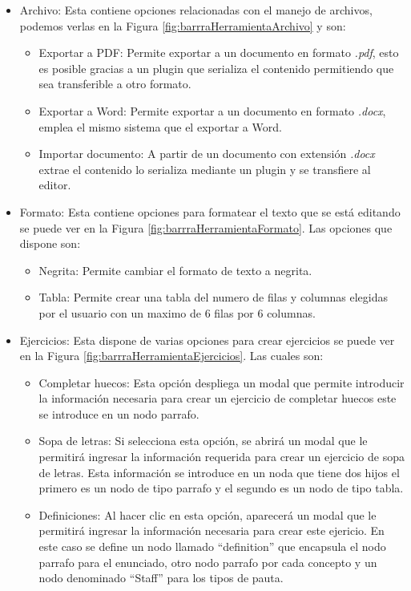 \begin{itemize}
  \item Archivo: Esta contiene opciones relacionadas con el manejo de archivos, podemos verlas en la Figura \ref{fig:barrraHerramientaArchivo} y son:
        \begin{itemize}
          \item  Exportar a PDF: Permite exportar a un documento en formato \textit{.pdf}, esto es posible gracias a un plugin que serializa el contenido permitiendo que sea transferible a otro formato.
          \item  Exportar a Word: Permite exportar a un documento en formato \textit{.docx}, emplea el mismo sistema que el exportar a Word.
          \item Importar documento: A partir de un documento con extensión \textit{.docx} extrae el contenido lo serializa mediante un plugin y se transfiere al editor.
        \end{itemize}
  \item Formato: Esta contiene opciones para formatear el texto que se está editando se puede ver en la Figura \ref{fig:barrraHerramientaFormato}. Las opciones que dispone son:
        \begin{itemize}
          \item Negrita: Permite cambiar el formato de texto a negrita.
          \item Tabla: Permite crear una tabla del numero de filas y columnas elegidas por el usuario con un maximo de 6 filas por 6 columnas.
        \end{itemize}
  \item Ejercicios: Esta dispone de varias opciones para crear ejercicios se puede ver en la Figura \ref{fig:barrraHerramientaEjercicios}. Las cuales son:
        \begin{itemize}
          \item Completar huecos: Esta opción despliega un modal que permite introducir la información necesaria para crear un ejercicio de completar huecos este se introduce en un nodo parrafo.
          \item Sopa de letras: Si selecciona esta opción, se abrirá un modal que le permitirá ingresar la información requerida para crear un ejercicio de sopa de letras. Esta información se introduce en un noda que tiene dos hijos el primero es un nodo de tipo parrafo y el segundo es un nodo de tipo tabla.
          \item Definiciones: Al hacer clic en esta opción, aparecerá un modal que le permitirá ingresar la información necesaria para crear este ejericio. En este caso se define un nodo llamado ``definition'' que encapsula el nodo parrafo para el enunciado, otro nodo parrafo por cada concepto y un nodo denominado ``Staff'' para los tipos de pauta.

\end{itemize}
\end{itemize}

